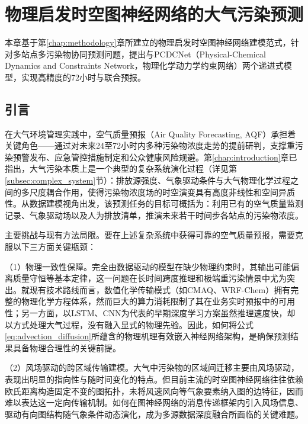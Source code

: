
\chapter{物理启发时空图神经网络的大气污染预测}
\label{chap:prediction}

本章基于第\ref{chap:methodology}章所建立的物理启发时空图神经网络建模范式，针对多站点多污染物协同预测问题，提出\ModelPred{}\citep{wang2020pm2}与PCDCNet（Physical-Chemical Dynamics and Constraints Network，物理化学动力学约束网络）\citep{wang2025pcdcnet}两个递进式模型，实现高精度的72小时\PM 与\ozone 联合预报。

\section{引言}
\label{sec:pred_intro}

在大气环境管理实践中，空气质量预报（Air Quality Forecasting, AQF）承担着关键角色——通过对未来24至72小时内多种污染物浓度走势的提前研判，支撑重污染预警发布、应急管控措施制定和公众健康风险规避。第\ref{chap:introduction}章已指出，大气污染本质上是一个典型的复杂系统演化过程（详见第\ref{subsec:complex_system}节）：排放源强度、气象驱动条件与大气物理化学过程之间的多尺度耦合作用，使得污染物浓度场的时空演变具有高度非线性和空间异质性。从数据建模视角出发，该预测任务的目标可概括为：利用已有的空气质量监测记录、气象驱动场以及人为排放清单，推演未来若干时间步各站点的污染物浓度。

主要挑战与现有方法局限。要在上述复杂系统中获得可靠的空气质量预报，需要克服以下三方面关键瓶颈：

（1）物理一致性保障。完全由数据驱动的模型在缺少物理约束时，其输出可能偏离质量守恒等基本定律，这一问题在长时间跨度推理和极端重污染情景中尤为突出。就现有技术路线而言，数值化学传输模式（如CMAQ、WRF-Chem）拥有完整的物理化学方程体系，然而巨大的算力消耗限制了其在业务实时预报中的可用性；另一方面，以LSTM、CNN为代表的早期深度学习方案虽然推理速度快，却以方式处理大气过程，没有融入显式的物理先验。因此，如何将公式\eqref{eq:advection_diffusion}所蕴含的物理机理有效嵌入神经网络架构，是确保预测结果具备物理合理性的关键前提。

（2）风场驱动的跨区域传输建模。大气中污染物的区域间迁移主要由风场驱动，表现出明显的指向性与随时间变化的特点。但目前主流的时空图神经网络往往依赖欧氏距离构造固定不变的图拓扑，未将风速风向等气象要素纳入图的边特征，因而难以表达这一定向传输机制。如何在图神经网络的消息传递框架内引入风场信息、驱动有向图结构随气象条件动态演化，成为多源数据深度融合所面临的关键难题。

